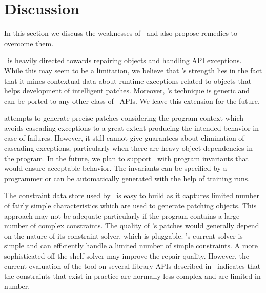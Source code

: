 \section{Discussion}
\label{sec:discussion}

In this section we discuss the weaknesses of \tool\ and also propose
remedies to overcome them.

 \tool\ is heavily directed towards repairing 
  objects and handling API
exceptions. While this may seem to be a limitation, we believe that \tool's
strength lies in the fact that it mines contextual data about runtime exceptions
related to  objects that helps development of intelligent patches.
Moreover, \tool's technique is generic and can be ported to any other class of
\java\ APIs. We leave this extension for the future.

 \tool attempts to
generate precise patches considering the program context which avoids
cascading exceptions to a great extent producing the intended behavior in case
of failures. However, it still cannot give guarantees about elimination of cascading
exceptions, particularly when there are heavy object dependencies in the program.
In the future, we plan to support \tool\ with program invariants that would ensure 
acceptable behavior. The invariants can be specified by a programmer or can be
automatically generated with the help of training runs.

 The constraint data store used by
\tool\ is easy to build as it captures
limited number of fairly simple  characteristics which are used to
generate patching  objects. This approach may not be adequate particularly
if the program contains a large number of complex constraints. The quality of
\tool's patches would generally depend on the nature of its constraint solver,
which is pluggable. \tool's current solver is simple and can efficiently
handle a limited number of simple constraints. A more sophisticated off-the-shelf solver may improve
the repair quality. However, the current evaluation of the tool
on several library APIs described in~ indicates that the
constraints that exist in practice are normally less complex and are limited in number.